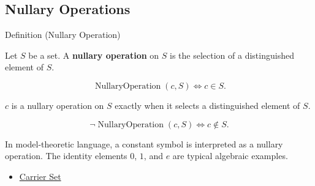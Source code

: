 \subsection*{Nullary Operations}
\label{subsec:nullary-operations}

\begin{definitionbox}{Definition (Nullary Operation)}
\begin{definition}
\label{def:nullary-operation}
Let $S$ be a set.
A \textbf{nullary operation} on $S$ is the selection of a distinguished element
of $S$.
\end{definition}
\end{definitionbox}

\begin{remark*}
\[
\operatorname{NullaryOperation}(c,S)
\Longleftrightarrow
c\in S.
\]
\end{remark*}

\begin{remark*}
$c$ is a nullary operation on $S$ exactly when it selects a distinguished
element of $S$.
\end{remark*}

\begin{remark*}
\[
\neg\operatorname{NullaryOperation}(c,S)
\Longleftrightarrow
c\notin S.
\]
\end{remark*}

\begin{remark*}[Interpretation]
In model-theoretic language, a constant symbol is interpreted as a nullary
operation.  The identity elements $0$, $1$, and $e$ are typical algebraic
examples.
\end{remark*}

\begin{dependencies}
\begin{itemize}
  \item \hyperref[def:carrier-set]{Carrier Set}
\end{itemize}
\end{dependencies}
